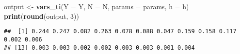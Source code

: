 \documentclass[11pt,]{article}
\newenvironment{Shaded}{\begin{snugshade}}{\end{snugshade}}
\newcommand{\DataTypeTok}[1]{\textcolor[rgb]{0.13,0.29,0.53}{#1}}
\newcommand{\DecValTok}[1]{\textcolor[rgb]{0.00,0.00,0.81}{#1}}
\newcommand{\KeywordTok}[1]{\textcolor[rgb]{0.13,0.29,0.53}{\textbf{#1}}}
\newcommand{\NormalTok}[1]{#1}
\newcommand{\StringTok}[1]{\textcolor[rgb]{0.31,0.60,0.02}{#1}}
\begin{document}
\begin{Shaded}
\begin{Highlighting}[]
\NormalTok{output <-}\StringTok{ }\KeywordTok{vars_ti}\NormalTok{(}\DataTypeTok{Y =}\NormalTok{ Y, }\DataTypeTok{N =}\NormalTok{ N, }\DataTypeTok{params =}\NormalTok{ params, }\DataTypeTok{h =}\NormalTok{ h)}
\KeywordTok{print}\NormalTok{(}\KeywordTok{round}\NormalTok{(output, }\DecValTok{3}\NormalTok{))}
\end{Highlighting}
\end{Shaded}

\begin{verbatim}
##  [1] 0.244 0.247 0.082 0.263 0.078 0.088 0.047 0.159 0.158 0.117 0.002 0.006
## [13] 0.003 0.003 0.002 0.002 0.003 0.003 0.001 0.004
\end{verbatim}
\end{document}
